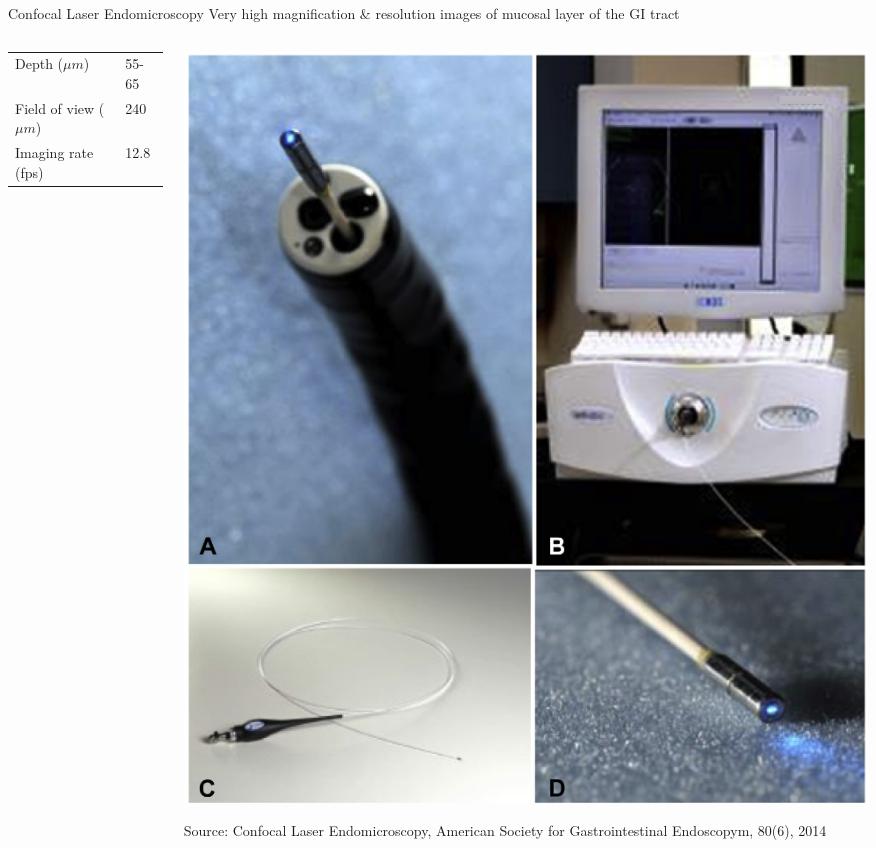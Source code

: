 \begin{frame}{Confocal Laser Endomicroscopy}
	Very high magnification \& resolution images of mucosal layer of the GI tract

	\begin{columns}[T]
		\begin{column}{0.4\textwidth}
			\begin{tabular}{ll}
				Depth ($\mu m$)         & 55-65 \\
				Field of view ($\mu m$) & 240   \\
				Imaging rate (fps)      & 12.8  \\
			\end{tabular}
		\end{column}
		\begin{column}{0.5\textwidth}
			\includegraphics[height=0.7\textheight]{img2/cle_system.png}

			\tiny{Source: Confocal Laser Endomicroscopy, American Society for Gastrointestinal Endoscopym, 80(6), 2014}
		\end{column}
	\end{columns}
\end{frame}
